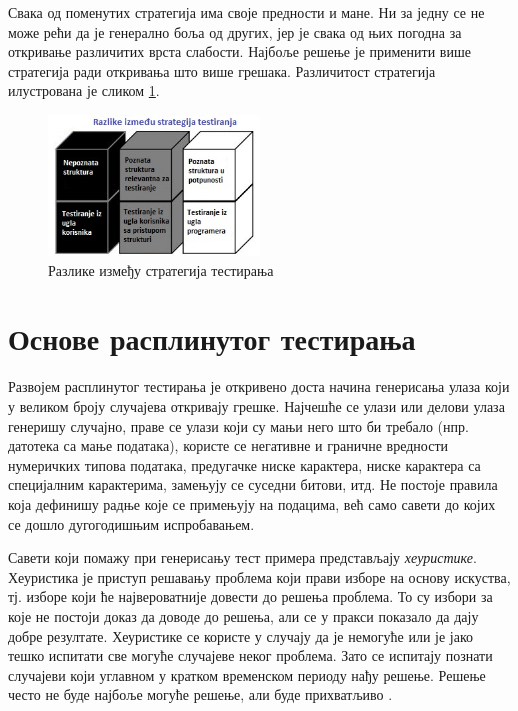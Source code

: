 \documentclass[12pt,oneside]{memoir}
\begin{document}
Свака од поменутих стратегија има своје предности и мане. Ни за једну се не може рећи да је генерално боља од других, јер је свака од њих погодна за откривање различитих врста слабости. Најбоље решење је применити више стратегија ради откривања што више грешака. Различитост стратегија илустрована је сликом \ref{fig:boxes}.

\begin{figure}[!ht]
\centering
\includegraphics[width=0.5\textwidth]{boxes.jpg}
\caption{Разлике између стратегија тестирања}
\label{fig:boxes}
\end{figure}

\section{Основе расплинутог тестирања}
\label{sec:osnoveRasplTestiranja}

Развојем расплинутог тестирања је откривено доста начина генерисања улаза који у великом броју случајева откривају грешке. Најчешће се улази или делови улаза генеришу случајно, праве се улази који су мањи него што би требало (нпр. датотека са мање података), користе се негативне и граничне вредности нумеричких типова података, предугачке ниске карактера, ниске карактера са специјалним карактерима, замењују се суседни битови, итд. Не постоје правила која дефинишу радње које се примењују на подацима, већ само савети до којих се дошло дугогодишњим испробавањем.

Савети који помажу при генерисању тест примера представљају \textit{хеуристике}. Хеуристика је приступ решавању проблема који прави изборе на основу искуства, тј. изборе који ће највероватније довести до решења проблема. То су избори за које не постоји доказ да доводе до решења, али се у пракси показало да дају добре резултате. Хеуристике се користе у случају да је немогуће или је јако тешко испитати све могуће случајеве неког проблема. Зато се испитају познати случајеви који углавном у кратком временском периоду нађу решење. Решење често не буде најбоље могуће решење, али буде прихватљиво \cite{heuristics}.
\end{document}
